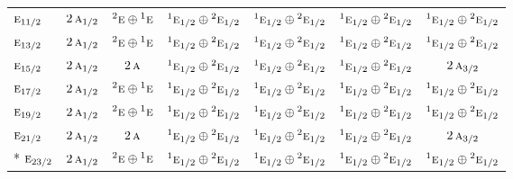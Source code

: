 \documentclass[10pt,a4paper]{article}
\numberwithin{equation}{section}
\newcommand{\irr}[1]{\text{\normalfont\scshape #1}}
\newcommand{\conjpair}[1]{{}^{#1}}
\begin{document}
{\begin{longtable}{@{}lcccccc@{}}
$\irr{e}_{11/2}$ & $2\,\irr{a}_{1/2}$ & $\conjpair{2}\irr{e}\oplus \conjpair{1}\irr{e}$ & $\conjpair{1}\irr{e}_{1/2}\oplus \conjpair{2}\irr{e}_{1/2}$ & $\conjpair{1}\irr{e}_{1/2}\oplus \conjpair{2}\irr{e}_{1/2}$ & $\conjpair{1}\irr{e}_{1/2}\oplus \conjpair{2}\irr{e}_{1/2}$ & $\conjpair{1}\irr{e}_{1/2}\oplus \conjpair{2}\irr{e}_{1/2}$\\
$\irr{e}_{13/2}$ & $2\,\irr{a}_{1/2}$ & $\conjpair{2}\irr{e}\oplus \conjpair{1}\irr{e}$ & $\conjpair{1}\irr{e}_{1/2}\oplus \conjpair{2}\irr{e}_{1/2}$ & $\conjpair{1}\irr{e}_{1/2}\oplus \conjpair{2}\irr{e}_{1/2}$ & $\conjpair{1}\irr{e}_{1/2}\oplus \conjpair{2}\irr{e}_{1/2}$ & $\conjpair{1}\irr{e}_{1/2}\oplus \conjpair{2}\irr{e}_{1/2}$\\
$\irr{e}_{15/2}$ & $2\,\irr{a}_{1/2}$ & $2\,\irr{a}$ & $\conjpair{1}\irr{e}_{1/2}\oplus \conjpair{2}\irr{e}_{1/2}$ & $\conjpair{1}\irr{e}_{1/2}\oplus \conjpair{2}\irr{e}_{1/2}$ & $\conjpair{1}\irr{e}_{1/2}\oplus \conjpair{2}\irr{e}_{1/2}$ & $2\,\irr{a}_{3/2}$\\
$\irr{e}_{17/2}$ & $2\,\irr{a}_{1/2}$ & $\conjpair{2}\irr{e}\oplus \conjpair{1}\irr{e}$ & $\conjpair{1}\irr{e}_{1/2}\oplus \conjpair{2}\irr{e}_{1/2}$ & $\conjpair{1}\irr{e}_{1/2}\oplus \conjpair{2}\irr{e}_{1/2}$ & $\conjpair{1}\irr{e}_{1/2}\oplus \conjpair{2}\irr{e}_{1/2}$ & $\conjpair{1}\irr{e}_{1/2}\oplus \conjpair{2}\irr{e}_{1/2}$\\
$\irr{e}_{19/2}$ & $2\,\irr{a}_{1/2}$ & $\conjpair{2}\irr{e}\oplus \conjpair{1}\irr{e}$ & $\conjpair{1}\irr{e}_{1/2}\oplus \conjpair{2}\irr{e}_{1/2}$ & $\conjpair{1}\irr{e}_{1/2}\oplus \conjpair{2}\irr{e}_{1/2}$ & $\conjpair{1}\irr{e}_{1/2}\oplus \conjpair{2}\irr{e}_{1/2}$ & $\conjpair{1}\irr{e}_{1/2}\oplus \conjpair{2}\irr{e}_{1/2}$\\
$\irr{e}_{21/2}$ & $2\,\irr{a}_{1/2}$ & $2\,\irr{a}$ & $\conjpair{1}\irr{e}_{1/2}\oplus \conjpair{2}\irr{e}_{1/2}$ & $\conjpair{1}\irr{e}_{1/2}\oplus \conjpair{2}\irr{e}_{1/2}$ & $\conjpair{1}\irr{e}_{1/2}\oplus \conjpair{2}\irr{e}_{1/2}$ & $2\,\irr{a}_{3/2}$\\*
$\irr{e}_{23/2}$ & $2\,\irr{a}_{1/2}$ & $\conjpair{2}\irr{e}\oplus \conjpair{1}\irr{e}$ & $\conjpair{1}\irr{e}_{1/2}\oplus \conjpair{2}\irr{e}_{1/2}$ & $\conjpair{1}\irr{e}_{1/2}\oplus \conjpair{2}\irr{e}_{1/2}$ & $\conjpair{1}\irr{e}_{1/2}\oplus \conjpair{2}\irr{e}_{1/2}$ & $\conjpair{1}\irr{e}_{1/2}\oplus \conjpair{2}\irr{e}_{1/2}$\\
\bottomrule\end{longtable}}
\end{document}
